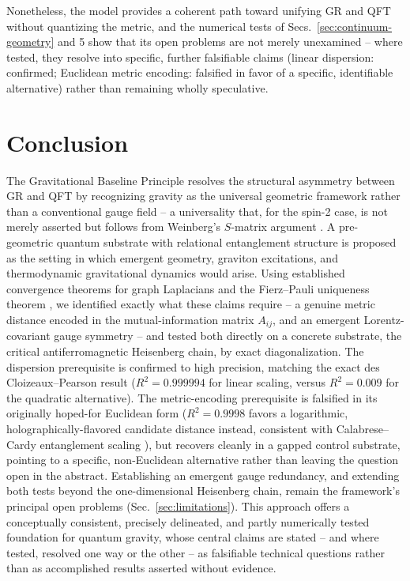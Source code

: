 \documentclass[11pt]{article}
\begin{document}
Nonetheless, the model provides a coherent path toward unifying GR and QFT without quantizing the metric, and the numerical tests of Secs.~\ref{sec:continuum-geometry} and 5 show that its open problems are not merely unexamined -- where tested, they resolve into specific, further falsifiable claims (linear dispersion: confirmed; Euclidean metric encoding: falsified in favor of a specific, identifiable alternative) rather than remaining wholly speculative.

\section{Conclusion}

The Gravitational Baseline Principle resolves the structural asymmetry between GR and QFT by recognizing gravity as the universal geometric framework rather than a conventional gauge field -- a universality that, for the spin-2 case, is not merely asserted but follows from Weinberg's $S$-matrix argument \cite{Weinberg}. A pre-geometric quantum substrate with relational entanglement structure is proposed as the setting in which emergent geometry, graviton excitations, and thermodynamic gravitational dynamics would arise. Using established convergence theorems for graph Laplacians \cite{BelkinNiyogi,Singer} and the Fierz--Pauli uniqueness theorem \cite{FierzPauli,Hinterbichler}, we identified exactly what these claims require -- a genuine metric distance encoded in the mutual-information matrix $A_{ij}$, and an emergent Lorentz-covariant gauge symmetry -- and tested both directly on a concrete substrate, the critical antiferromagnetic Heisenberg chain, by exact diagonalization. The dispersion prerequisite is confirmed to high precision, matching the exact des Cloizeaux--Pearson result \cite{DesCloizeauxPearson} ($R^2=0.999994$ for linear scaling, versus $R^2=0.009$ for the quadratic alternative). The metric-encoding prerequisite is falsified in its originally hoped-for Euclidean form ($R^2=0.9998$ favors a logarithmic, holographically-flavored candidate distance instead, consistent with Calabrese--Cardy entanglement scaling \cite{CalabreseCardy}), but recovers cleanly in a gapped control substrate, pointing to a specific, non-Euclidean alternative rather than leaving the question open in the abstract. Establishing an emergent gauge redundancy, and extending both tests beyond the one-dimensional Heisenberg chain, remain the framework's principal open problems (Sec.~\ref{sec:limitations}). This approach offers a conceptually consistent, precisely delineated, and partly numerically tested foundation for quantum gravity, whose central claims are stated -- and where tested, resolved one way or the other -- as falsifiable technical questions rather than as accomplished results asserted without evidence.
\end{document}
